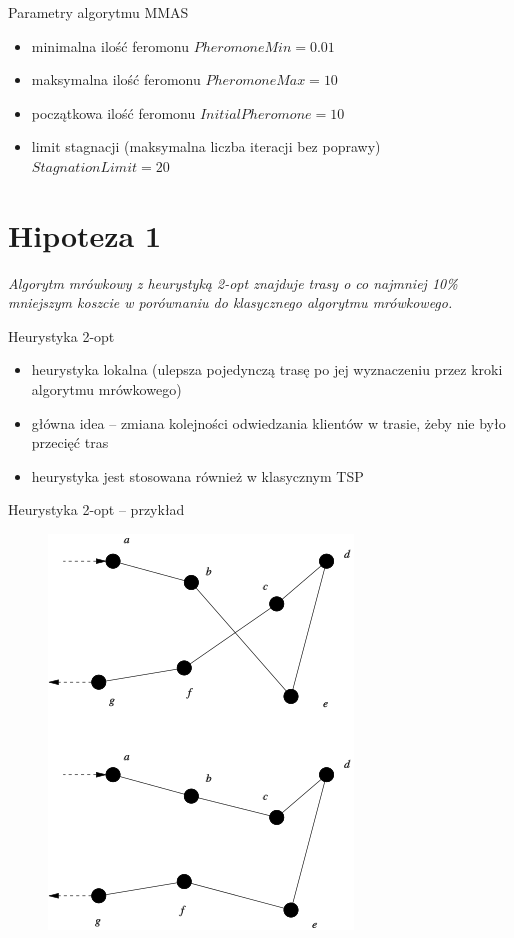 \documentclass{beamer}
\begin{document}
\begin{frame}{Parametry algorytmu MMAS}
    \begin{itemize}
        \setlength\itemsep{1em}
        \item minimalna ilość feromonu $PheromoneMin = 0.01$
        \item maksymalna ilość feromonu $PheromoneMax = 10$
        \item początkowa ilość feromonu $InitialPheromone = 10$ 
        \item limit stagnacji (maksymalna liczba iteracji bez poprawy) $StagnationLimit = 20$
    \end{itemize}
\end{frame}

\section*{Hipoteza 1}
\begin{frame}
    \textit{Algorytm mrówkowy z heurystyką 2-opt znajduje trasy o co najmniej 10\% mniejszym koszcie w porównaniu do klasycznego algorytmu mrówkowego.}
\end{frame}

\begin{frame}{Heurystyka 2-opt}
    \begin{itemize}
        \setlength\itemsep{1em}
        \item heurystyka lokalna (ulepsza pojedynczą trasę po jej wyznaczeniu przez kroki algorytmu mrówkowego)
        \item główna idea -- zmiana kolejności odwiedzania klientów w trasie, żeby nie było przecięć tras
        \item heurystyka jest stosowana również w klasycznym TSP
    \end{itemize}
\end{frame}

\begin{frame}{Heurystyka 2-opt -- przykład}
    \begin{figure}
        \centering
        \includegraphics[width=0.5\linewidth]{img/2-opt_wiki.png}
    \end{figure}        
\end{frame}
\end{document}
